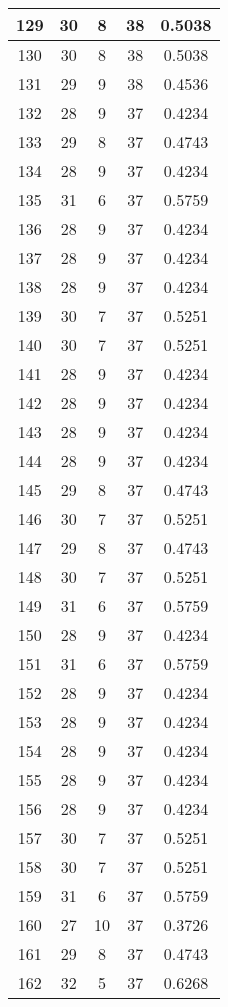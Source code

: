 \documentclass[letterpaper, 12pt]{article}
\begin{document}
\begin{longtable}{|c|c|c|c|c|}
\hline
129 & 30 & 8 & 38 & 0.5038 \\
\hline
130 & 30 & 8 & 38 & 0.5038 \\
\hline
131 & 29 & 9 & 38 & 0.4536 \\
\hline
132 & 28 & 9 & 37 & 0.4234 \\
\hline
133 & 29 & 8 & 37 & 0.4743 \\
\hline
134 & 28 & 9 & 37 & 0.4234 \\
\hline
135 & 31 & 6 & 37 & 0.5759 \\
\hline
136 & 28 & 9 & 37 & 0.4234 \\
\hline
137 & 28 & 9 & 37 & 0.4234 \\
\hline
138 & 28 & 9 & 37 & 0.4234 \\
\hline
139 & 30 & 7 & 37 & 0.5251 \\
\hline
140 & 30 & 7 & 37 & 0.5251 \\
\hline
141 & 28 & 9 & 37 & 0.4234 \\
\hline
142 & 28 & 9 & 37 & 0.4234 \\
\hline
143 & 28 & 9 & 37 & 0.4234 \\
\hline
144 & 28 & 9 & 37 & 0.4234 \\
\hline
145 & 29 & 8 & 37 & 0.4743 \\
\hline
146 & 30 & 7 & 37 & 0.5251 \\
\hline
147 & 29 & 8 & 37 & 0.4743 \\
\hline
148 & 30 & 7 & 37 & 0.5251 \\
\hline
149 & 31 & 6 & 37 & 0.5759 \\
\hline
150 & 28 & 9 & 37 & 0.4234 \\
\hline
151 & 31 & 6 & 37 & 0.5759 \\
\hline
152 & 28 & 9 & 37 & 0.4234 \\
\hline
153 & 28 & 9 & 37 & 0.4234 \\
\hline
154 & 28 & 9 & 37 & 0.4234 \\
\hline
155 & 28 & 9 & 37 & 0.4234 \\
\hline
156 & 28 & 9 & 37 & 0.4234 \\
\hline
157 & 30 & 7 & 37 & 0.5251 \\
\hline
158 & 30 & 7 & 37 & 0.5251 \\
\hline
159 & 31 & 6 & 37 & 0.5759 \\
\hline
160 & 27 & 10 & 37 & 0.3726 \\
\hline
161 & 29 & 8 & 37 & 0.4743 \\
\hline
162 & 32 & 5 & 37 & 0.6268 \\

\end{longtable}
\end{document}
